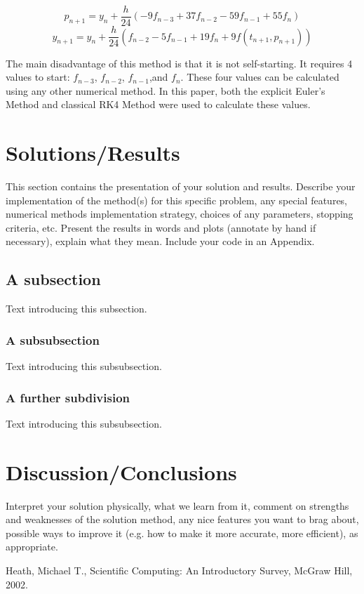 \documentclass[11pt]{article}
\begin{document}
$$p_{n+1}=y_{n}+\frac{h}{24}(-9f_{n-3}+37f_{n-2}-59f_{n-1}+55f_{n})$$
$$y_{n+1}=y_{n}+\frac{h}{24}(f_{n-2}-5f_{n-1}+19f_{n}+9f(t_{n+1}, p_{n+1}))$$

The main disadvantage of this method is that it is not self-starting. It requires 
4 values to start: $f_{n-3}$, $f_{n-2}$, $f_{n-1}$,and $f_{n}$. These four values 
can be calculated using any other numerical method. In this paper, both the 
explicit Euler's Method and classical RK4 Method were used to calculate these values.

\section{Solutions/Results}\label{S:4}
This section contains the presentation of your solution and results.
Describe your implementation of the method(s) for this specific problem, any 
special features, numerical methods implementation  strategy, choices of any 
parameters, stopping criteria, etc.
Present the results in words and plots (annotate by hand if necessary), explain 
what they mean. Include your code in an Appendix. 
\subsection{A subsection}
%
Text introducing this subsection. 
\subsubsection{A subsubsection}
%
Text introducing this subsubsection. 
\subsubsection{A further subdivision}
%
Text introducing this subsubsection. 
\section{Discussion/Conclusions}\label{S:5}
Interpret your solution physically, what we learn from it, comment on strengths and
weaknesses of the solution method, any nice features you want to brag about, 
possible ways to improve it (e.g. how to make it more accurate, more efficient), as
appropriate.
\begin{thebibliography}{100}
Heath, Michael T., Scientific Computing: An Introductory Survey, McGraw Hill, 2002.
%
%
\end{thebibliography}
\newpage
\appendix 
\setcounter{section}{0}           
\end{document}
